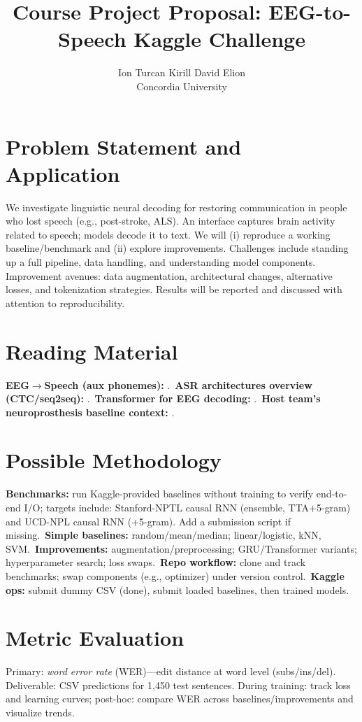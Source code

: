 \documentclass[10pt,twocolumn,letterpaper]{article}
\title{Course Project Proposal: EEG-to-Speech Kaggle Challenge}
\author{
Ion Turcan \quad Kirill \quad David \quad Elion\\
Concordia University
}
\begin{document}
\maketitle
\thispagestyle{empty}


\section{Problem Statement and Application}
We investigate linguistic neural decoding for restoring communication in people who lost speech (e.g., post-stroke, ALS). An interface captures brain activity related to speech; models decode it to text. We will (i) reproduce a working baseline/benchmark and (ii) explore improvements. Challenges include standing up a full pipeline, data handling, and understanding model components. Improvement avenues: data augmentation, architectural changes, alternative losses, and tokenization strategies. Results will be reported and discussed with attention to reproducibility.

\section{Reading Material}
\textbf{EEG$\to$Speech (aux phonemes):} \cite{lee_enhancing_2025}.\
\textbf{ASR architectures overview (CTC/seq2seq):} \cite{papastratis_speech_2021}.\
\textbf{Transformer for EEG decoding:} \cite{lee_eeg-transformer_2021}.\
\textbf{Host team’s neuroprosthesis baseline context:} \cite{card_accurate_2024}.

\section{Possible Methodology}
\textbf{Benchmarks:} run Kaggle-provided baselines without training to verify end-to-end I/O; targets include: Stanford-NPTL causal RNN (ensemble, TTA+5-gram) and UCD-NPL causal RNN (+5-gram). Add a submission script if missing.\
\textbf{Simple baselines:} random/mean/median; linear/logistic, kNN, SVM.\
\textbf{Improvements:} augmentation/preprocessing; GRU/Transformer variants; hyperparameter search; loss swaps.\
\textbf{Repo workflow:} clone and track benchmarks; swap components (e.g., optimizer) under version control.\
\textbf{Kaggle ops:} submit dummy CSV (done), submit loaded baselines, then trained models.

\section{Metric Evaluation}
Primary: \emph{word error rate} (WER)—edit distance at word level (subs/ins/del). Deliverable: CSV predictions for 1{,}450 test sentences. During training: track loss and learning curves; post-hoc: compare WER across baselines/improvements and visualize trends.
\end{document}
